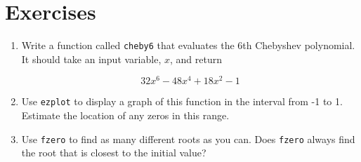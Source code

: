 \section{Exercises}

\begin{ex}

\begin{enumerate}


\item Write a function called {\tt cheby6} that evaluates the
6th Chebyshev polynomial.  It should take an input variable,
$x$, and return

\begin{equation}
32 x^6 - 48 x^4 + 18 x^2 - 1
\end{equation}

\item Use {\tt ezplot} to display a graph of this function in the
interval from -1 to 1.  Estimate the location of any zeros in this
range.

\item Use {\tt fzero} to find as many different roots as you can.
Does {\tt fzero} always find the root that is closest to the initial
value?

\end{enumerate}

\end{ex}


